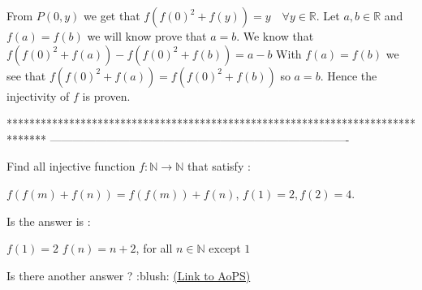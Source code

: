 \begin{solution}
	From $P(0,y)$ we get that $f(f(0)^2+f(y))=y\quad\forall y\in\mathbb{R}$. Let $a,b\in\mathbb{R}$ and $f(a)=f(b)$ we will know prove that $a=b$. We know that
$f(f(0)^2+f(a))-f(f(0)^2+f(b))=a-b$
With $f(a)=f(b)$ we see that $f(f(0)^2+f(a))=f(f(0)^2+f(b))$ so $a=b$. Hence the injectivity of $f$ is proven.
\end{solution}
*******************************************************************************
-------------------------------------------------------------------------------

\begin{problem}
	Find all injective function $f : \mathbb{N} \rightarrow \mathbb{N}$ that satisfy :

$f(f(m) + f(n)) = f(f(m)) + f(n)$, $f(1) = 2, f(2) = 4$.

Is the answer is :

$f(1) = 2$
$f(n) = n + 2$, for all $n \in \mathbb{N}$ except $1$

Is there another answer ? :blush:
	\flushright \href{https://artofproblemsolving.com/community/c6h484810}{(Link to AoPS)}
\end{problem}




